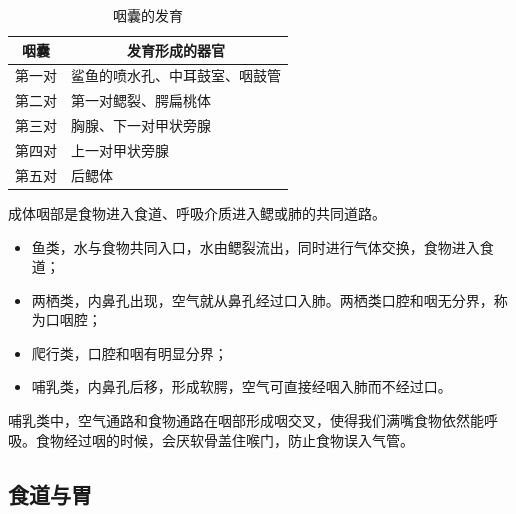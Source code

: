 \begin{table}[htbp]
	\centering
	\begin{tabularx}{\textwidth}{|c|X|}
		\hline
		咽囊 & \multicolumn{1}{c|}{发育形成的器官} \\ \hline
		第一对 & 鲨鱼的喷水孔、中耳鼓室、咽鼓管 \\ \hline
		第二对 & 第一对鳃裂、腭扁桃体 \\ \hline
		第三对 & 胸腺、下一对甲状旁腺 \\ \hline
		第四对 & 上一对甲状旁腺 \\ \hline
		第五对 & 后鳃体 \\ \hline
	\end{tabularx}
	\caption{咽囊的发育}
	\label{tab:pharyngeal_pouch_development}
\end{table}

成体咽部是食物进入食道、呼吸介质进入鳃或肺的共同道路。

\begin{itemize}
	\item 鱼类，水与食物共同入口，水由鳃裂流出，同时进行气体交换，食物进入食道；
	\item 两栖类，内鼻孔出现，空气就从鼻孔经过口入肺。两栖类口腔和咽无分界，称为口咽腔；
	\item 爬行类，口腔和咽有明显分界；
	\item 哺乳类，内鼻孔后移，形成软腭，空气可直接经咽入肺而不经过口。
\end{itemize}

哺乳类中，空气通路和食物通路在咽部形成咽交叉，使得我们满嘴食物依然能呼吸。食物经过咽的时候，会厌软骨盖住喉门，防止食物误入气管。

\subsection{食道与胃}

